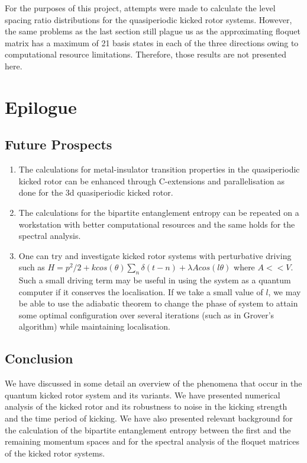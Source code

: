 \documentclass[twocolumn]{report}
\begin{document}
For the purposes of this project, attempts were made to calculate the
level spacing ratio distributions for the quasiperiodic kicked rotor
systems. However, the same problems as the last section still plague
us as the approximating floquet matrix has a maximum of 21 basis states
in each of the three directions owing to computational resource limitations.
Therefore, those results are not presented here.

\chapter{Epilogue}
\section{Future Prospects}
\begin{enumerate}
    \item The calculations for metal-insulator transition properties
    in the quasiperiodic kicked rotor can be enhanced through C-extensions
    and parallelisation as done for the 3d quasiperiodic kicked rotor.

    \item The calculations for the bipartite entanglement entropy can
    be repeated on a workstation with better computational resources
    and the same holds for the spectral analysis.

    \item One can try and investigate kicked rotor systems with
    perturbative driving such as $H = p^2/2 + k cos(\theta)\sum_{n}
    \delta (t - n) + \lambda A cos(l\theta)$ where $A << V$. Such a
    small driving term may be useful in using the system as a
    quantum computer if it conserves the localisation. If we take a
    small value of $l$, we may be able to use the adiabatic theorem
    to change the phase of system to attain some optimal configuration
    over several iterations (such as in Grover's algorithm) while
    maintaining localisation.
\end{enumerate}

\section{Conclusion}
We have discussed in some detail an overview of the phenomena that occur
in the quantum kicked rotor system and its variants. We have presented
numerical analysis of the kicked rotor and its robustness to noise in the
kicking strength and the time period of kicking. We have also presented
relevant background for the calculation of the bipartite entanglement
entropy between the first and the remaining momentum spaces and for the
spectral analysis of the floquet matrices of the kicked rotor systems.

\printbibliography
\end{document}
